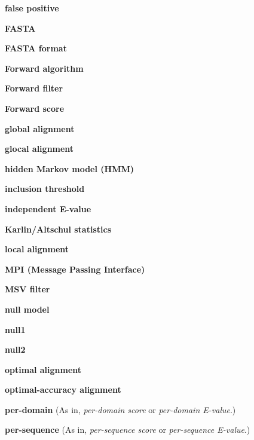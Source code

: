 \begin{wideitem}
\item[\textbf{false positive}]

\item[\textbf{FASTA}]

\item[\textbf{FASTA format}]

\item[\textbf{Forward algorithm}]

\item[\textbf{Forward filter}]

\item[\textbf{Forward score}]

\item[\textbf{global alignment}]

\item[\textbf{glocal alignment}]

\item[\textbf{hidden Markov model (HMM)}]

\item[\textbf{inclusion threshold}]

\item[\textbf{independent E-value}]

\item[\textbf{Karlin/Altschul statistics}]

\item[\textbf{local alignment}]

\item[\textbf{MPI (Message Passing Interface)}]

\item[\textbf{MSV filter}]

\item[\textbf{null model}]

\item[\textbf{null1}]

\item[\textbf{null2}]

\item[\textbf{optimal alignment}]

\item[\textbf{optimal-accuracy alignment}]

\item[\textbf{per-domain}] (As in, \emph{per-domain score} or
  \emph{per-domain E-value}.)

\item[\textbf{per-sequence}] (As in, \emph{per-sequence score} or
  \emph{per-sequence E-value}.)


\end{wideitem}
